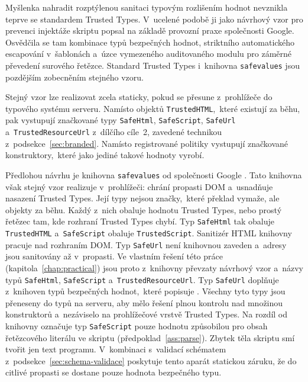 Myšlenka nahradit rozptýlenou sanitaci typovým rozlišením hodnot nevznikla teprve se standardem Trusted Types. V~ucelené podobě ji jako návrhový vzor pro prevenci injektáže skriptu popsal \textcite{kern2014tangled} na základě provozní praxe společnosti Google. Osvědčila se tam kombinace typů bezpečných hodnot, striktního automatického escapování v~šablonách a~úzce vymezeného auditovaného modulu pro záměrné převedení surového řetězce. Standard Trusted Types i~knihovna \texttt{safevalues} jsou pozdějším zobecněním stejného vzoru.

Stejný vzor lze realizovat zcela staticky, pokud se přesune z~prohlížeče do typového systému serveru. Namísto objektů \texttt{TrustedHTML},~které existují za běhu, pak vystupují značkované typy \texttt{SafeHtml}, \texttt{SafeScript}, \texttt{SafeUrl} a~\texttt{TrustedResourceUrl} z~dílčího cíle~2, zavedené technikou z~podsekce~\ref{sec:branded}. Namísto registrované politiky vystupují značkované konstruktory,~které jako jediné takové hodnoty vyrobí.

Předlohou návrhu je knihovna \texttt{safevalues} od společnosti Google \parencite{googleSafevalues}. Tato knihovna však stejný vzor realizuje v~prohlížeči: chrání propasti DOM a~usnadňuje nasazení Trusted Types. Její typy nejsou značky,~které překlad vymaže, ale objekty za běhu. Každý z~nich obaluje hodnotu Trusted Types, nebo prostý řetězec tam, kde rozhraní Trusted Types chybí. Typ \texttt{SafeHtml} tak obaluje \texttt{TrustedHTML} a~\texttt{SafeScript} obaluje \texttt{TrustedScript}. Sanitizér HTML knihovny pracuje nad rozhraním DOM. Typ \texttt{SafeUrl} není knihovnou zaveden a~adresy jsou sanitovány až v~propasti. Ve vlastním řešení této práce (kapitola~\ref{chap:practical}) jsou proto z~knihovny převzaty návrhový vzor a~názvy typů \texttt{SafeHtml}, \texttt{SafeScript} a~\texttt{TrustedResourceUrl}. Typ \texttt{SafeUrl} doplňuje z~knihoven typů bezpečných hodnot,~které popisuje \textcite{kern2014tangled}. Všechny tyto typy jsou přeneseny do typů na serveru, aby mělo řešení plnou kontrolu nad množinou konstruktorů a~nezáviselo na prohlížečové vrstvě Trusted Types. Na rozdíl od knihovny označuje typ \texttt{SafeScript} pouze hodnotu způsobilou pro obsah řetězcového literálu ve skriptu (předpoklad~\ref{ass:parse}). Zbytek těla skriptu smí tvořit jen text programu. V~kombinaci s~validací schématem z~podsekce~\ref{sec:schema-validace} poskytuje tento aparát statickou záruku, že do citlivé propasti se dostane pouze hodnota bezpečného typu.

